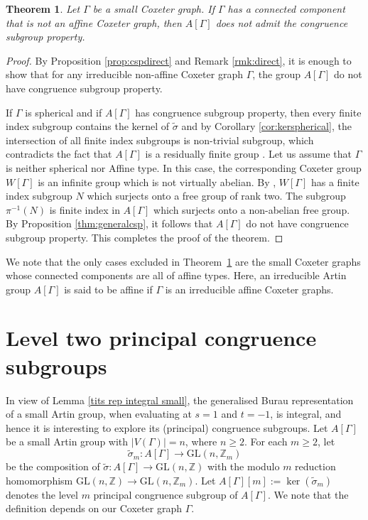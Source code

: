 \documentclass[12pt]{amsart}
\newtheorem{theorem}[equation]{Theorem}
\theoremstyle{definition}
\numberwithin{equation}{section}
\newcommand{\GL}{\mathrm{GL}}
\begin{document}
\begin{theorem}\label{mainthm:artin}
Let $\Gamma$ be a small Coxeter graph. If $\Gamma$ has a connected component that is not an affine Coxeter graph, then $A[\Gamma]$ does not admit the congruence subgroup property.
\end{theorem}
\begin{proof}
By Proposition \ref{prop:cspdirect} and Remark \ref{rmk:direct}, it is enough to show that for any irreducible non-affine Coxeter graph $\Gamma$, the group $A[\Gamma]$ do not have congruence subgroup property.

 If $\Gamma$ is spherical and if $A[\Gamma]$ has congruence subgroup property, then every finite index subgroup contains the kernel of $\tilde{\sigma}$ and by Corollary \ref{cor:kerspherical}, the intersection of all finite index subgroups is non-trivial subgroup, which contradicts the fact that $A[\Gamma]$ is a residually finite group  \cite{MR1942303, MR2004479, MR1888796}.
 Let us assume that $\Gamma$ is neither spherical nor Affine type.  In this case, the corresponding Coxeter group $W[\Gamma]$ is an infinite group which is not virtually abelian. By \cite[Theorem II]{MR2700693}, $W[\Gamma]$ has a finite index subgroup $N$ which surjects onto a free group of rank two. The subgroup $\pi^{-1}(N)$ is finite index in $A[\Gamma]$ which surjects onto a non-abelian free group. By Proposition \ref{thm:generalcsp}, it follows that $A[\Gamma]$ do not have congruence subgroup property. This completes the proof of the theorem.
\end{proof}
We note that the only cases excluded in Theorem~\ref{mainthm:artin} are the small Coxeter graphs whose connected components are all of affine types. Here, an irreducible Artin group $A[\Gamma]$ is said to be affine if $\Gamma$ is an irreducible affine Coxeter graphs.

\medskip
\section{Level two principal congruence subgroups}\label{section 6}
In view of Lemma \ref{tits rep integral small}, the  generalised Burau representation of a small Artin group, when evaluating  at $s=1$ and $t=-1$, is integral, and hence it is interesting to explore its (principal) congruence subgroups. Let $A[\Gamma]$ be a small Artin group with $|V(\Gamma)|=n$, where $n \ge 2$. For each  $m \ge 2$, let  $$\tilde{\sigma}_m: A[\Gamma] \to  \GL(n,\mathbb Z_m)$$ be the composition of $\tilde{\sigma}: A[\Gamma]\to  \GL(n,\mathbb Z)$ with the modulo $m$ reduction homomorphism $\GL(n,\mathbb Z) \to \GL(n,\mathbb Z_m)$. Let $A[\Gamma][m]:=\ker(\tilde{\sigma}_m)$ denotes the level $m$ principal congruence subgroup of $A[\Gamma]$. We note that the definition depends on our Coxeter graph $\Gamma$.
\end{document}
